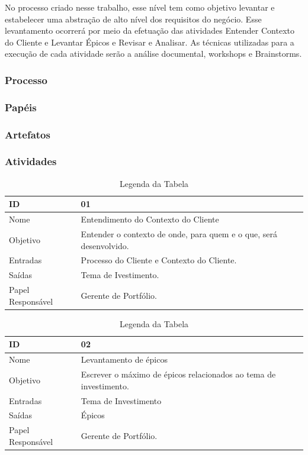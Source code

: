 No processo criado nesse trabalho, esse nível tem como objetivo levantar e estabelecer
uma abstração de alto nível dos requisitos do negócio. Esse levantamento ocorrerá
por meio da efetuação das atividades Entender Contexto do Cliente e Levantar Épicos
e Revisar e Analisar. As técnicas utilizadas para a execução de cada atividade serão
a análise documental, workshops e Brainstorms.

\subsubsection{Processo}
\subsubsection{Papéis}
\subsubsection{Artefatos}
\subsubsection{Atividades}

  \begin{table}[H]
    \centering
      \begin{tabular}{| m{5em} | m{10cm} |}
        \hline
        ID       & 01   \\ \hline
        Nome     & Entendimento do Contexto do Cliente   \\ \hline
        Objetivo & Entender o contexto de onde, para quem e o que, será desenvolvido. \\ \hline
        Entradas & Processo do Cliente e Contexto do Cliente.   \\ \hline
        Saídas   & Tema de Ivestimento. \\ \hline
        Papel Responsável   & Gerente de Portfólio. \\ \hline
      \end{tabular}
      \caption{Legenda da Tabela}
      \label{tabela:atividade1}
  \end{table}

  \begin{table}[H]
    \centering
      \begin{tabular}{| m{5em} | m{10cm} |}
        \hline
        ID       & 02   \\ \hline
        Nome     & Levantamento de épicos   \\ \hline
        Objetivo & Escrever o máximo de épicos relacionados ao tema de investimento. \\ \hline
        Entradas & Tema de Investimento   \\ \hline
        Saídas   & Épicos \\ \hline
        Papel Responsável   & Gerente de Portfólio. \\ \hline
      \end{tabular}
      \caption{Legenda da Tabela}
      \label{tabela:atividade2}
  \end{table}

